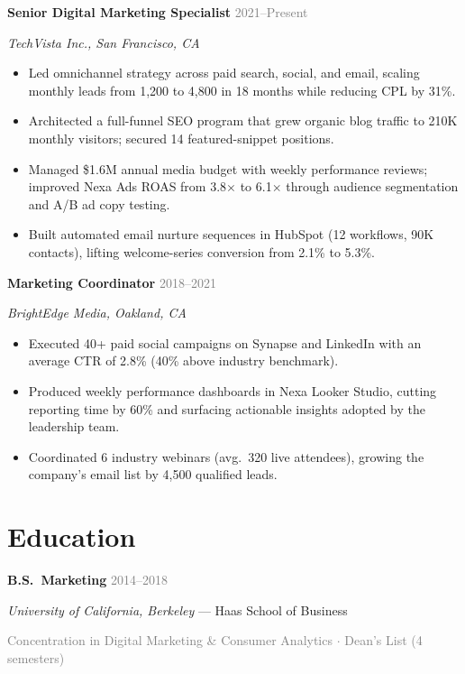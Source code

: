 \documentclass[11pt,letterpaper]{article}
\begin{document}
\textbf{Senior Digital Marketing Specialist} \hfill \textcolor{gray}{2021--Present}
\par\textit{TechVista Inc., San Francisco, CA}
\begin{itemize}
  \item Led omnichannel strategy across paid search, social, and email,
        scaling monthly leads from 1,200 to 4,800 in 18 months while reducing
        CPL by 31\%.
  \item Architected a full-funnel SEO program that grew organic blog traffic
        to 210K monthly visitors; secured 14 featured-snippet positions.
  \item Managed \$1.6M annual media budget with weekly performance reviews;
        improved Nexa Ads ROAS from 3.8$\times$ to 6.1$\times$ through
        audience segmentation and A/B ad copy testing.
  \item Built automated email nurture sequences in HubSpot (12 workflows,
        90K contacts), lifting welcome-series conversion from 2.1\% to 5.3\%.
\end{itemize}

\vspace{4pt}
\textbf{Marketing Coordinator} \hfill \textcolor{gray}{2018--2021}
\par\textit{BrightEdge Media, Oakland, CA}
\begin{itemize}
  \item Executed 40+ paid social campaigns on Synapse and LinkedIn with an
        average CTR of 2.8\% (40\% above industry benchmark).
  \item Produced weekly performance dashboards in Nexa Looker Studio,
        cutting reporting time by 60\% and surfacing actionable insights
        adopted by the leadership team.
  \item Coordinated 6 industry webinars (avg.\ 320 live attendees), growing
        the company's email list by 4,500 qualified leads.
\end{itemize}

\section{Education}
\textbf{B.S.\ Marketing} \hfill \textcolor{gray}{2014--2018}
\par\textit{University of California, Berkeley} --- Haas School of Business
\par\textcolor{gray}{\small Concentration in Digital Marketing \& Consumer Analytics \hspace{4pt}$\cdot$\hspace{4pt} Dean's List (4 semesters)}
\end{document}
